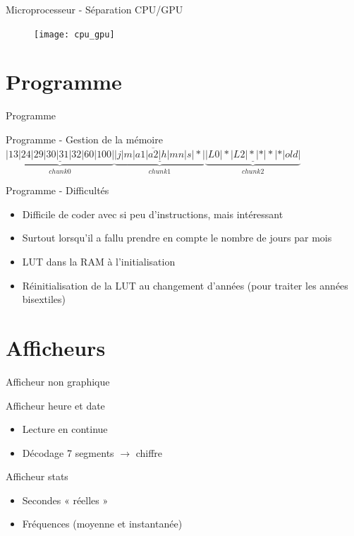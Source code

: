 \documentclass[handout]{beamer}
\begin{document}
\begin{frame}{Microprocesseur - Séparation CPU/GPU}
	\begin{figure}
		\centering
		\texttt{[image: cpu\_gpu]}
	\end{figure}
\end{frame}



\section{Programme}
\begin{frame}{Programme}
	
\end{frame}

\begin{frame}{Programme - Gestion de la mémoire}
	$\overline{\underbrace{\underline{|13|24|29|30|31|32|60|100|}}_{chunk 0}\underbrace{\underline{|j|m|a1|a2|h|mn|s|*|}}_{chunk 1}\underbrace{\underline{|L0|*|L2|*|*|*|*|old|}}_{chunk 2}}$
\end{frame}

\begin{frame}{Programme - Difficultés}
	\begin{itemize}
		\item Difficile de coder avec si peu d'instructions, mais intéressant
		\item Surtout lorsqu'il a fallu prendre en compte le nombre de jours par mois
		\item LUT dans la RAM à l'initialisation
		\item Réinitialisation de la LUT au changement d'années (pour traiter les années bisextiles)
	\end{itemize}
\end{frame}


\section{Afficheurs}
\begin{frame}{Afficheur non graphique}
	\begin{block}{Afficheur heure et date}
		\begin{itemize}
			\item Lecture en continue
			\item Décodage 7 segments $\rightarrow$ chiffre
		\end{itemize}
	\end{block}
	
	\pause
	
	\begin{block}{Afficheur stats}
		\begin{itemize}
			\item Secondes « réelles »
			\item Fréquences (moyenne et instantanée)
		\end{itemize}
	\end{block}
\end{frame}
\end{document}
